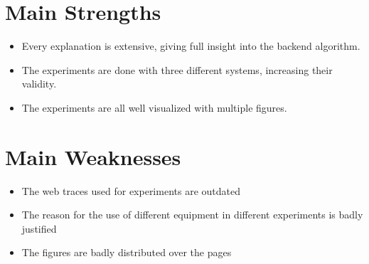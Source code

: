 \documentclass[a4paper]{article}
\begin{document}
\section{Main Strengths}
\begin{itemize}
\setlength{\itemsep}{-2pt}
\item Every explanation is extensive, giving full insight into the backend algorithm.
\item The experiments are done with three different systems, increasing their validity.
\item The experiments are all well visualized with multiple figures.
\end{itemize}

\section{Main Weaknesses}
\begin{itemize}
\setlength{\itemsep}{0pt}
\item The web traces used for experiments are outdated
\item The reason for the use of different equipment in different experiments is badly justified
\item The figures are badly distributed over the pages
\end{itemize}
\end{document}
